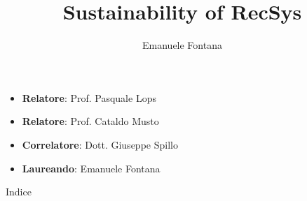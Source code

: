 \documentclass[aspectratio=169,xcolor=dvipsnames, t]{beamer}
\title[full title]{Sustainability of RecSys}
\author{Emanuele Fontana}
\institute[]{Università degli Studi di Bari Aldo Moro}
\date{}
\begin{document}
\maketitlepage
\begin{frame}[t]{}
    \begin{itemize}
        \item \textbf{Relatore}: Prof. Pasquale Lops
        \item \textbf{Relatore}: Prof. Cataldo Musto
        \item \textbf{Correlatore}: Dott. Giuseppe Spillo
        \item \textbf{Laureando}: Emanuele Fontana
    \end{itemize}
\end{frame}



\begin{frame}[t]{Indice}
    \tableofcontents
\end{frame}









\makefinalpage
\end{document}
